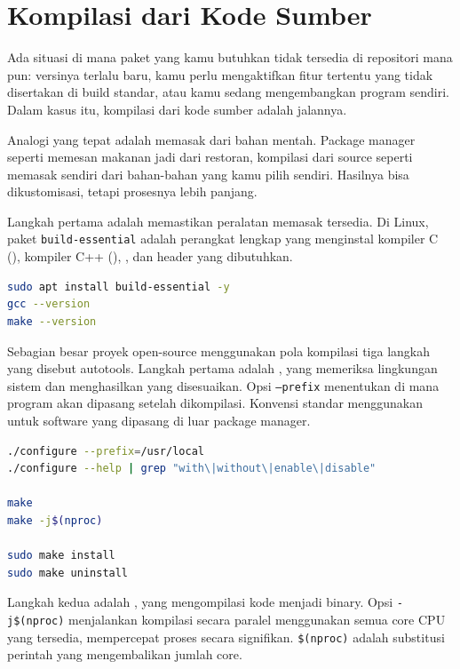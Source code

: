 \section{Kompilasi dari Kode Sumber}
\label{sec:compile-from-source}

Ada situasi di mana paket yang kamu butuhkan tidak tersedia di repositori mana
pun: versinya terlalu baru, kamu perlu mengaktifkan fitur tertentu yang tidak
disertakan di build standar, atau kamu sedang mengembangkan program sendiri.
Dalam kasus itu, kompilasi dari kode sumber adalah jalannya.

Analogi yang tepat adalah memasak dari bahan mentah. Package manager seperti
memesan makanan jadi dari restoran, kompilasi dari source seperti memasak sendiri
dari bahan-bahan yang kamu pilih sendiri. Hasilnya bisa dikustomisasi, tetapi
prosesnya lebih panjang.

Langkah pertama adalah memastikan peralatan memasak tersedia. Di Linux, paket
\texttt{build-essential} adalah perangkat lengkap yang menginstal kompiler C
(), kompiler C++ (), , dan header yang dibutuhkan.

\begin{lstlisting}[language=bash, caption={Instalasi build tools}]
sudo apt install build-essential -y
gcc --version
make --version
\end{lstlisting}

Sebagian besar proyek open-source menggunakan pola kompilasi tiga langkah yang
disebut autotools. Langkah pertama adalah , yang memeriksa
lingkungan sistem dan menghasilkan  yang disesuaikan. Opsi
\texttt{--prefix} menentukan di mana program akan dipasang setelah dikompilasi.
Konvensi standar menggunakan  untuk software yang dipasang di
luar package manager.

\begin{lstlisting}[language=bash, caption={Pola kompilasi autotools}]
./configure --prefix=/usr/local
./configure --help | grep "with\|without\|enable\|disable"

make
make -j$(nproc)

sudo make install
sudo make uninstall
\end{lstlisting}

Langkah kedua adalah , yang mengompilasi kode menjadi binary. Opsi
\texttt{-j\$(nproc)} menjalankan kompilasi secara paralel menggunakan semua
core CPU yang tersedia, mempercepat proses secara signifikan. \texttt{\$(nproc)}
adalah substitusi perintah yang mengembalikan jumlah core.

